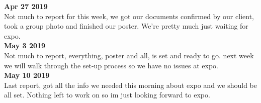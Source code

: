 \textbf{Apr 27 2019}\\
Not much to report for this week, we got our documents confirmed by our client, took a group photo and finished our poster. We’re pretty much just waiting for expo.\\

\textbf{May 3 2019}\\
 Not much to report, everything, poster and all, is set and ready to go. next week we will walk through the set-up process so we have no issues at expo.\\

\textbf{May 10 2019}\\
 Last report, got all the info we needed this morning about expo and we should be all set. Nothing left to work on so im just looking forward to expo.\\
